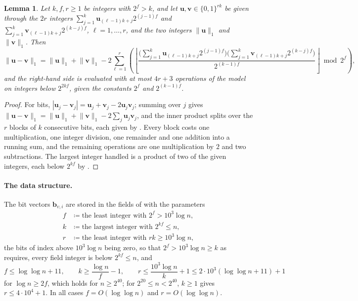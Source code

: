 \documentclass[11pt]{article}
\newtheorem{lemma}[theorem]{Lemma}
\theoremstyle{remark}
\newcommand{\uu}{\mathbf u}
\newcommand{\defeq}{\coloneqq}
\newcommand{\norm}[1]{\lVert#1\rVert}
\newcommand{\bb}{\mathbf b}
\newcommand{\vv}{\mathbf v}
\begin{document}
\begin{lemma}\label{lem:packed-hamming}
Let $k,f,r\ge1$ be integers with $2^{f}>k$, and let
$\uu,\vv\in\{0,1\}^{rk}$ be given through the $2r$ integers
$\sum_{j=1}^{k}\uu_{(\ell-1)k+j}2^{(j-1)f}$ and
$\sum_{j=1}^{k}\vv_{(\ell-1)k+j}2^{(k-j)f}$,
$\ell=1,\dots,r$, and the two integers $\norm{\uu}_1$ and $\norm{\vv}_1$.
Then
\[
\norm{\uu-\vv}_1
=\norm{\uu}_1+\norm{\vv}_1
-2\sum_{\ell=1}^{r}\left(\left\lfloor
\frac{\bigl(\sum_{j=1}^{k}\uu_{(\ell-1)k+j}2^{(j-1)f}\bigr)
\bigl(\sum_{j=1}^{k}\vv_{(\ell-1)k+j}2^{(k-j)f}\bigr)}{2^{(k-1)f}}
\right\rfloor\bmod2^{f}\right),
\]
and the right-hand side is evaluated with at most $4r+3$ operations of
the model on integers below $2^{2kf}$, given the constants $2^{f}$ and
$2^{(k-1)f}$.
\end{lemma}
\begin{proof}
For bits, $|\uu_j-\vv_j|=\uu_j+\vv_j-2\uu_j\vv_j$; summing over $j$ gives
$\norm{\uu-\vv}_1=\norm{\uu}_1+\norm{\vv}_1-2\sum_j\uu_j\vv_j$, and the
inner product splits over the $r$ blocks of $k$ consecutive bits, each
given by .
Every block costs one multiplication, one integer division, one
remainder and one addition into a running sum, and the remaining
operations are one multiplication by $2$ and two subtractions.
The largest integer handled is a product of two of the given integers,
each below $2^{kf}$ by .
\end{proof}

\paragraph{The data structure.}
The bit vectors $\bb_{v,i}$ are stored in the fields of
 with the parameters
\begin{align*}
f&\defeq\text{the least integer with }2^{f}>10^{3}\log n,\\
k&\defeq\text{the largest integer with }2^{kf}\le n,\\
r&\defeq\text{the least integer with }rk\ge10^{3}\log n ,
\end{align*}
the bits of index above $10^{3}\log n$ being zero, so that
$2^{f}>10^{3}\log n\ge k$ as  requires, every
field integer is below $2^{kf}\le n$, and
\begin{equation}\label{eq:packed-params}
f\le\log\log n+11,\qquad
k\ge\frac{\log n}{f}-1,\qquad
r\le\frac{10^{3}\log n}{k}+1\le2\cdot10^{3}(\log\log n+11)+1
\end{equation}
for $\log n\ge2f$, which holds for $n\ge2^{40}$; for $2^{20}\le n<2^{40}$,
$k\ge1$ gives $r\le4\cdot10^{4}+1$.
In all cases $f=O(\log\log n)$ and $r=O(\log\log n)$.
\end{document}
